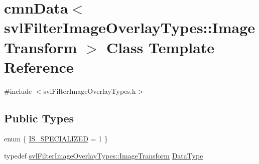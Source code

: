 \hypertarget{classcmn_data_3_01svl_filter_image_overlay_types_1_1_image_transform_01_4}{}\section{cmn\+Data$<$ svl\+Filter\+Image\+Overlay\+Types\+:\+:Image\+Transform $>$ Class Template Reference}
\label{classcmn_data_3_01svl_filter_image_overlay_types_1_1_image_transform_01_4}


{\ttfamily \#include $<$svl\+Filter\+Image\+Overlay\+Types.\+h$>$}

\subsection*{Public Types}
\begin{DoxyCompactItemize}
\item 
enum \{ \hyperlink{classcmn_data_3_01svl_filter_image_overlay_types_1_1_image_transform_01_4_a921ed53da3a18b827bf192a30785b645a19f4b42a979d0470b8d1b2861a0f1e89}{I\+S\+\_\+\+S\+P\+E\+C\+I\+A\+L\+I\+Z\+E\+D} = 1
 \}
\item 
typedef \hyperlink{classsvl_filter_image_overlay_types_1_1_image_transform}{svl\+Filter\+Image\+Overlay\+Types\+::\+Image\+Transform} \hyperlink{classcmn_data_3_01svl_filter_image_overlay_types_1_1_image_transform_01_4_a58a4f448e85eeba8ac6a226c91e752d7}{Data\+Type}
\end{DoxyCompactItemize}
